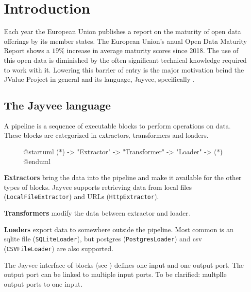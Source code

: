 \chapter{Introduction}
\label{chapter:Introduction}

Each year the European Union publishes a report on the maturity of open data offerings by its member states.
The European Union's anual Open Data Maturity Report shows a $19\%$ increase in average maturity scores since 2018. %
The use of this open data is diminished by the often significant technical knowledge required to work with it.
Lowering this barrier of entry is the major motivation beind the JValue Project \autocite{jvalue:landing} in general and its language, Jayvee, specifically \autocite{jvalue:jayvee}.

\section{The Jayvee language}
\label{section:jv_intro}

A pipeline is a sequence of executable blocks to perform operations on data.
These blocks are categorized in extractors, transformers and loaders.

\begin{figure}[h]
	\begin{center}
		\begin{plantuml}
			@startuml
			(*) -> "Extractor"
			-> "Transformer"
			-> "Loader"
			-> (*)
			@enduml
		\end{plantuml}
	\end{center}
\end{figure}

\textbf{Extractors} bring the data into the pipeline and make it available for the other types of blocks.
Jayvee supports retrieving data from local files (\Verb|LocalFileExtractor|) and \ac{URL}s (\Verb|HttpExtractor|).

\textbf{Transformers} modify the data between extractor and loader.

\textbf{Loaders} export data to somewhere outside the pipeline.
Most common is an sqlite file (\Verb|SQLiteLoader|), but postgres (\Verb|PostgresLoader|) and csv (\Verb|CSVFileLoader|) are also supported.

The Jayvee interface of blocks (see %
) defines one input and one output port.
The output port can be linked to multiple input ports.
To be clarified: multplle output ports to one input. %

